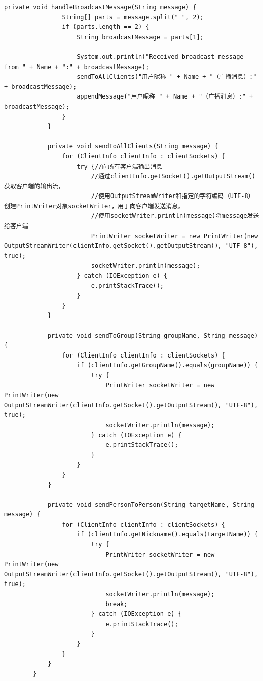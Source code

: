 \documentclass[UTF8,12pt]{article}
\begin{document}
\begin{lstlisting}[title=ChatServer.java源代码,frame=shadowbox]
            private void handleBroadcastMessage(String message) {
                String[] parts = message.split(" ", 2);
                if (parts.length == 2) {
                    String broadcastMessage = parts[1];
    
                    System.out.println("Received broadcast message from " + Name + ":" + broadcastMessage);
                    sendToAllClients("用户昵称 " + Name + "（广播消息）:" + broadcastMessage);
                    appendMessage("用户昵称 " + Name + "（广播消息）:" + broadcastMessage);
                }
            }
    
            private void sendToAllClients(String message) {
                for (ClientInfo clientInfo : clientSockets) {
                    try {//向所有客户端输出消息
                        //通过clientInfo.getSocket().getOutputStream()获取客户端的输出流，
                        //使用OutputStreamWriter和指定的字符编码（UTF-8）创建PrintWriter对象socketWriter，用于向客户端发送消息。
                        //使用socketWriter.println(message)将message发送给客户端
                        PrintWriter socketWriter = new PrintWriter(new OutputStreamWriter(clientInfo.getSocket().getOutputStream(), "UTF-8"), true);
                        socketWriter.println(message);
                    } catch (IOException e) {
                        e.printStackTrace();
                    }
                }
            }
    
            private void sendToGroup(String groupName, String message) {
                for (ClientInfo clientInfo : clientSockets) {
                    if (clientInfo.getGroupName().equals(groupName)) {
                        try {
                            PrintWriter socketWriter = new PrintWriter(new OutputStreamWriter(clientInfo.getSocket().getOutputStream(), "UTF-8"), true);
                            socketWriter.println(message);
                        } catch (IOException e) {
                            e.printStackTrace();
                        }
                    }
                }
            }
    
            private void sendPersonToPerson(String targetName, String message) {
                for (ClientInfo clientInfo : clientSockets) {
                    if (clientInfo.getNickname().equals(targetName)) {
                        try {
                            PrintWriter socketWriter = new PrintWriter(new OutputStreamWriter(clientInfo.getSocket().getOutputStream(), "UTF-8"), true);
                            socketWriter.println(message);
                            break;
                        } catch (IOException e) {
                            e.printStackTrace();
                        }
                    }
                }
            }
        }
    

\end{lstlisting}
\end{document}
